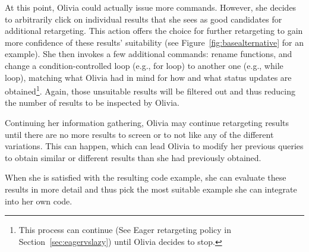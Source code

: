 At this point, Olivia could actually issue more commands. However, she decides to arbitrarily click on individual results that she sees as good candidates for additional retargeting. This action offers the choice for further retargeting to gain more confidence of these results' suitability (see Figure~\ref{fig:basealternative} for an example). She then invokes a few additional commands: rename functions, and change a condition-controlled loop (e.g., for loop) to another one (e.g., while loop), matching what Olivia had in mind for how and what status updates are obtained\footnote{This process can continue (See Eager retargeting policy in Section~\ref{sec:eagervslazy}) until Olivia decides to stop.}. Again, those unsuitable results will be filtered out and thus reducing the number of results to be inspected by Olivia.

Continuing her information gathering, Olivia may continue retargeting results until there are no more results to screen or to not like any of the different variations. This can happen, which can lead Olivia to modify her previous queries to obtain similar or different results than she had previously obtained.

When she is satisfied with the resulting code example, she can evaluate these results in more detail and thus pick the most suitable example she can integrate into her own code.

